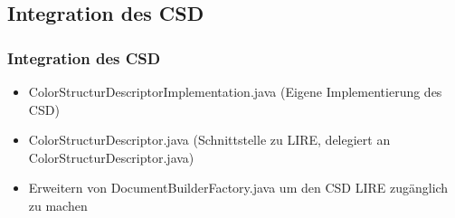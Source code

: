 \documentclass[11pt]{beamer}
\begin{document}
\subsection{Integration des CSD}
\begin{frame}
	\frametitle{Integration des CSD}
	\begin{itemize}
	  \item ColorStructurDescriptorImplementation.java (Eigene Implementierung des CSD)
	  \item ColorStructurDescriptor.java (Schnittstelle zu LIRE, delegiert an ColorStructurDescriptor.java)
	  \item Erweitern von DocumentBuilderFactory.java um den CSD LIRE zugänglich zu machen
	\end{itemize}
\end{frame}
\end{document}
